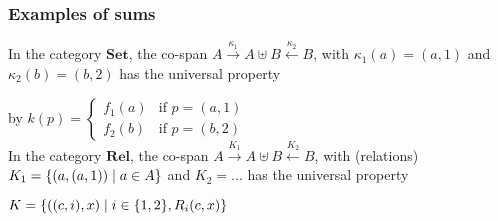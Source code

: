 \documentclass[handout]{beamer}
\newcommand{\bfsf}[1]{{\boldsymbol{#1}}}
\newcommand{\Set}{\bfsf{Set}}
\newcommand{\Rel}{\bfsf{Rel}}
\begin{document}
\frame
  {   
    \frametitle{Examples of sums}\label{Ch4:SumExa}

In the category $\Set$, the co-span 
$A\stackrel{\kappa_1}{\to} A\uplus B \stackrel{\kappa_2}{\leftarrow}B$,
with $\kappa_1(a) = (a,1)$ and $\kappa_2(b) = (b,2)$ has the universal property
by $k(p) =\left\{\begin{array}{ll} f_1(a) & \text{if $p=(a,1)$}\\f_2(b) &  \text{if $p=(b,2)$}\end{array}\right.$\\\vspace*{0.3cm}
In the category $\Rel$, the co-span 
$A\stackrel{K_1}{\to} A\uplus B \stackrel{K_2}{\leftarrow}B$,
with (relations)
$K_1 = \{(a,(a,1))\mid a\in A\}$ and $K_2 = ...$  has the universal property
$K=\{((c,i),x ) \mid i\in\{1,2\}, R_i(c,x)\}$ %
 }
\end{document}
